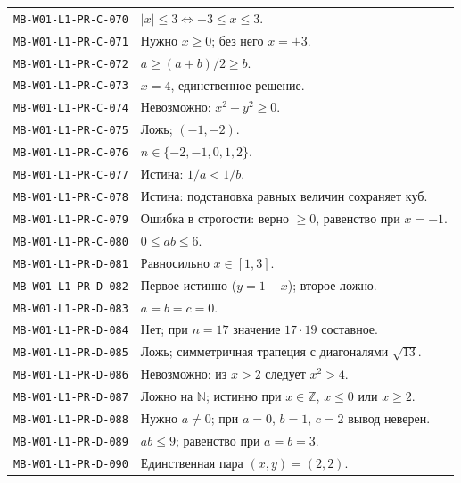 \documentclass[11pt,a4paper,openany]{book}
\newcommand{\muid}[1]{\texttt{\footnotesize #1}}
\begin{document}
\begin{longtable}{p{}p{}}
\muid{MB-W01-L1-PR-C-070} & $|x|\le3\Leftrightarrow-3\le x\le3$.\\

\muid{MB-W01-L1-PR-C-071} & Нужно $x\ge0$; без него $x=\pm3$.\\

\muid{MB-W01-L1-PR-C-072} & $a\ge(a+b)/2\ge b$.\\

\muid{MB-W01-L1-PR-C-073} & $x=4$, единственное решение.\\

\muid{MB-W01-L1-PR-C-074} & Невозможно: $x^2+y^2\ge0$.\\

\muid{MB-W01-L1-PR-C-075} & Ложь; $(-1,-2)$.\\

\muid{MB-W01-L1-PR-C-076} & $n\in\{-2,-1,0,1,2\}$.\\

\muid{MB-W01-L1-PR-C-077} & Истина: $1/a<1/b$.\\

\muid{MB-W01-L1-PR-C-078} & Истина: подстановка равных величин сохраняет куб.\\

\muid{MB-W01-L1-PR-C-079} & Ошибка в строгости: верно $\ge0$, равенство при $x=-1$.\\

\muid{MB-W01-L1-PR-C-080} & $0\le ab\le6$.\\

\muid{MB-W01-L1-PR-D-081} & Равносильно $x\in[1,3]$.\\

\muid{MB-W01-L1-PR-D-082} & Первое истинно ($y=1-x$); второе ложно.\\

\muid{MB-W01-L1-PR-D-083} & $a=b=c=0$.\\

\muid{MB-W01-L1-PR-D-084} & Нет; при $n=17$ значение $17\cdot19$ составное.\\

\muid{MB-W01-L1-PR-D-085} & Ложь; симметричная трапеция с диагоналями $\sqrt{13}$.\\

\muid{MB-W01-L1-PR-D-086} & Невозможно: из $x>2$ следует $x^2>4$.\\

\muid{MB-W01-L1-PR-D-087} & Ложно на $\mathbb N$; истинно при $x\in\mathbb Z$, $x\le0$ или $x\ge2$.\\

\muid{MB-W01-L1-PR-D-088} & Нужно $a\ne0$; при $a=0$, $b=1$, $c=2$ вывод неверен.\\

\muid{MB-W01-L1-PR-D-089} & $ab\le9$; равенство при $a=b=3$.\\

\muid{MB-W01-L1-PR-D-090} & Единственная пара $(x,y)=(2,2)$.\\

\bottomrule\end{longtable}\normalsize
\end{document}
